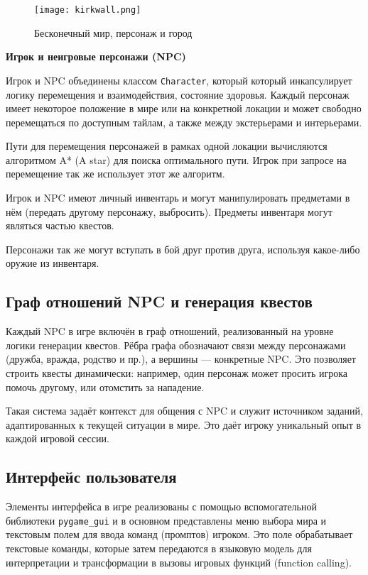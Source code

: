 \documentclass[14pt]{extarticle}
\begin{document}
\begin{figure}[h!]
    \centering
    \texttt{[image: kirkwall.png]}
    \caption{Бесконечный мир, персонаж и город}
    \label{fig:mylabel}
\end{figure}

\item \textbf{Игрок и неигровые персонажи (NPC)}

Игрок и NPC объединены классом \texttt{Character}, который который инкапсулирует логику перемещения и взаимодействия, состояние здоровья. Каждый персонаж имеет некоторое положение в мире или на конкретной локации и может свободно перемещаться по доступным тайлам, а также между экстерьерами и интерьерами.

Пути для перемещения персонажей в рамках одной локации вычисляются алгоритмом A* (A star)\cite{astar} для поиска оптимального пути. Игрок при запросе на перемещение так же использует этот же алгоритм.

Игрок и NPC имеют личный инвентарь и могут манипулировать предметами в нём (передать другому персонажу, выбросить). Предметы инвентаря могут являться частью квестов.

Персонажи так же могут вступать в бой друг против друга, используя какое-либо оружие из инвентаря.

\subsection{Граф отношений NPC и генерация квестов}

Каждый NPC в игре включён в граф отношений, реализованный на уровне логики генерации квестов. Рёбра графа обозначают связи между персонажами (дружба, вражда, родство и пр.), а вершины — конкретные NPC. Это позволяет строить квесты динамически: например, один персонаж может просить игрока помочь другому, или отомстить за нападение.

Такая система задаёт контекст для общения с NPC и служит источником заданий, адаптированных к текущей ситуации в мире. Это даёт игроку уникальный опыт в каждой игровой сессии.

\subsection{Интерфейс пользователя}

Элементы интерфейса в игре реализованы с помощью вспомогательной библиотеки \texttt{pygame\_gui} и в основном представлены меню выбора мира и текстовым полем для ввода команд (промптов) игроком. Это поле обрабатывает текстовые команды, которые затем передаются в языковую модель для интерпретации и трансформации в вызовы игровых функций (function calling).
\end{document}
